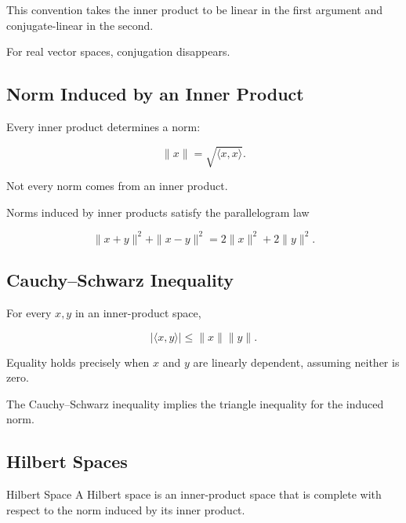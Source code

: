 This convention takes the inner product to be linear in the first
argument and conjugate-linear in the second.

For real vector spaces, conjugation disappears.

\subsection{Norm Induced by an Inner Product}
\label{subsec:inner-product-norm}

Every inner product determines a norm:

\[
\boxed{
\|x\|
=
\sqrt{\langle x,x\rangle}.
}
\]

Not every norm comes from an inner product.

Norms induced by inner products satisfy the parallelogram law

\[
\boxed{
\|x+y\|^2+\|x-y\|^2
=
2\|x\|^2+2\|y\|^2.
}
\]

\subsection{Cauchy--Schwarz Inequality}
\label{subsec:cauchy-schwarz-functional}

\begin{theorem}
For every \(x,y\) in an inner-product space,

\[
\boxed{
|\langle x,y\rangle|
\leq
\|x\|\|y\|.
}
\]
\end{theorem}

Equality holds precisely when \(x\) and \(y\) are linearly dependent,
assuming neither is zero.

The Cauchy--Schwarz inequality implies the triangle inequality for the
induced norm.

\subsection{Hilbert Spaces}
\label{subsec:hilbert-spaces}

\begin{definitionbox}{Hilbert Space}
A Hilbert space is an inner-product space that is complete with respect to
the norm induced by its inner product.
\end{definitionbox}

